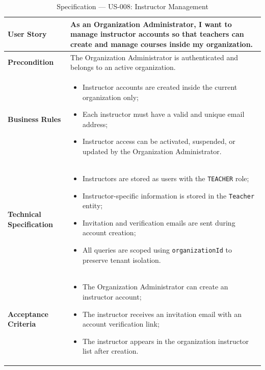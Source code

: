 \begin{table}[H]
\centering
\caption{Specification — US-008: Instructor Management}
\label{tab:us008}
\renewcommand{\arraystretch}{1}
\begin{tabularx}{\textwidth}{|p{2.5cm}|X|}
\hline
\textbf{User Story} & As an Organization Administrator, I want to manage instructor accounts so that teachers can create and manage courses inside my organization. \\
\hline
\textbf{Precondition} & The Organization Administrator is authenticated and belongs to an active organization. \\
\hline
\textbf{Business Rules} &
\begin{itemize}
  \item Instructor accounts are created inside the current organization only;
  \item Each instructor must have a valid and unique email address;
  \item Instructor access can be activated, suspended, or updated by the Organization Administrator.
\end{itemize} \\
\hline
\textbf{Technical Specification} &
\begin{itemize}
  \item Instructors are stored as users with the \texttt{TEACHER} role;
  \item Instructor-specific information is stored in the \texttt{Teacher} entity;
  \item Invitation and verification emails are sent during account creation;
  \item All queries are scoped using \texttt{organizationId} to preserve tenant isolation.
\end{itemize} \\
\hline
\textbf{Acceptance Criteria} &
\begin{itemize}
  \item The Organization Administrator can create an instructor account;
  \item The instructor receives an invitation email with an account verification link;
  \item The instructor appears in the organization instructor list after creation.
\end{itemize} \\
\hline
\end{tabularx}
\end{table}

